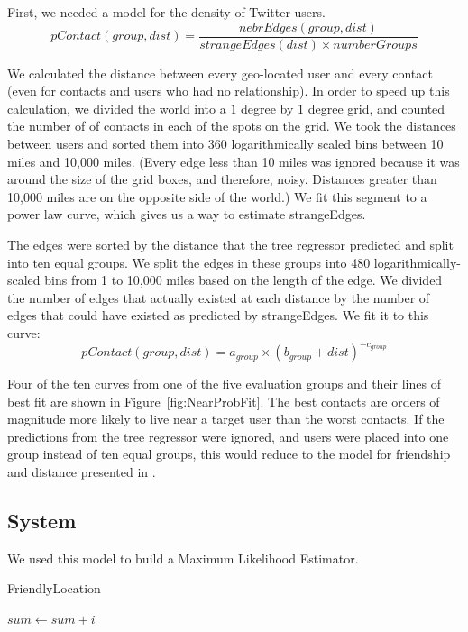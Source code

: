 First, we needed a model for the density of Twitter users.
\[
    pContact(group,dist) = \frac{nebrEdges(group,dist)}{strangeEdges(dist) \times numberGroups}
\]

We calculated the distance between every geo-located user and every contact
(even for contacts and users who had no relationship).
%
In order to speed up this calculation, we divided the world into a \.1 degree
by \.1 degree grid, and counted the number of of contacts in each of the spots
on the grid.
%
We took the distances between users and sorted them into 360 logarithmically
scaled bins between 10 miles and 10,000 miles.
%
(Every edge less than 10 miles was ignored because it was around the size of
the grid boxes, and therefore, noisy. Distances greater than 10,000 miles are
on the opposite side of the world.)
%
We fit this segment to a power law curve, which gives us a way to estimate
strangeEdges.

The edges were sorted by the distance that the tree regressor predicted and
split into ten equal groups.
%
We split the edges in these groups into 480 logarithmically-scaled bins from 1
to 10,000 miles based on the length of the edge.
%
We divided the number of edges that actually existed at each distance by the
number of edges that could have existed as predicted by strangeEdges.
%
We fit it to this curve:
%
\[
pContact(group, dist) = a_{group} \times (b_{group}+dist)^{-c_{group}}
\]

Four of the ten curves from one of the five evaluation groups and their lines
of best fit are shown in Figure~\ref{fig:NearProbFit}.
%
The best contacts are orders of magnitude more
likely to live near a target user than the worst contacts.
%
If the predictions from the tree regressor were ignored, and users were placed
into one group instead of ten equal groups, this would reduce to the model
for friendship and distance presented in \cite{backstrom2010find}.


\subsection{System}
We used this model to build a Maximum Likelihood Estimator.


\begin{algorithm}
  \caption{FriendlyLocation \label{alg:friendloc}}
  \begin{algorithmic}[0]
   \State $sum\gets sum+i$
  \EndFor
  \end{algorithmic}
\end{algorithm}

